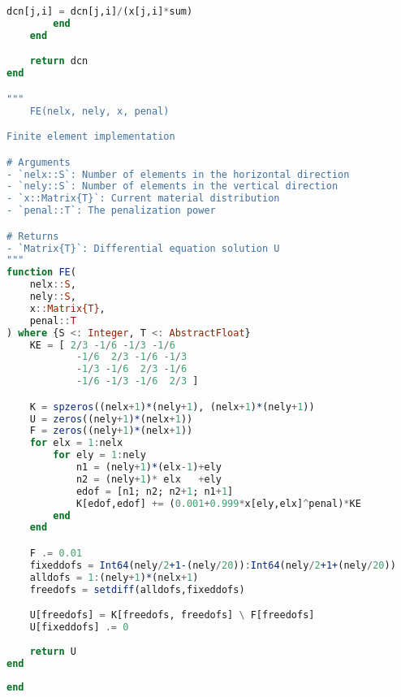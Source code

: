 \begin{lstlisting}[language=Julia, title=\texttt{toph.jl}, label={lst:toph}]
        dcn[j,i] = dcn[j,i]/(x[j,i]*sum)
        end
    end

    return dcn
end

"""
    FE(nelx, nely, x, penal)

Finite element implementation

# Arguments
- `nelx::S`: Number of elements in the horizontal direction
- `nely::S`: Number of elements in the vertical direction
- `x::Matrix{T}`: Current material distribution
- `penal::T`: The penalization power

# Returns
- `Matrix{T}`: Differential equation solution U
"""
function FE(
    nelx::S,
    nely::S,
    x::Matrix{T},
    penal::T
) where {S <: Integer, T <: AbstractFloat}
    KE = [ 2/3 -1/6 -1/3 -1/6
            -1/6  2/3 -1/6 -1/3
            -1/3 -1/6  2/3 -1/6
            -1/6 -1/3 -1/6  2/3 ]

    K = spzeros((nelx+1)*(nely+1), (nelx+1)*(nely+1))
    U = zeros((nely+1)*(nelx+1))
    F = zeros((nely+1)*(nelx+1))
    for elx = 1:nelx
        for ely = 1:nely 
            n1 = (nely+1)*(elx-1)+ely
            n2 = (nely+1)* elx   +ely
            edof = [n1; n2; n2+1; n1+1]
            K[edof,edof] += (0.001+0.999*x[ely,elx]^penal)*KE
        end
    end

    F .= 0.01
    fixeddofs = Int64(nely/2+1-(nely/20)):Int64(nely/2+1+(nely/20))
    alldofs = 1:(nely+1)*(nelx+1)
    freedofs = setdiff(alldofs,fixeddofs)

    U[freedofs] = K[freedofs, freedofs] \ F[freedofs]
    U[fixeddofs] .= 0
    
    return U
end
    
end
\end{lstlisting}